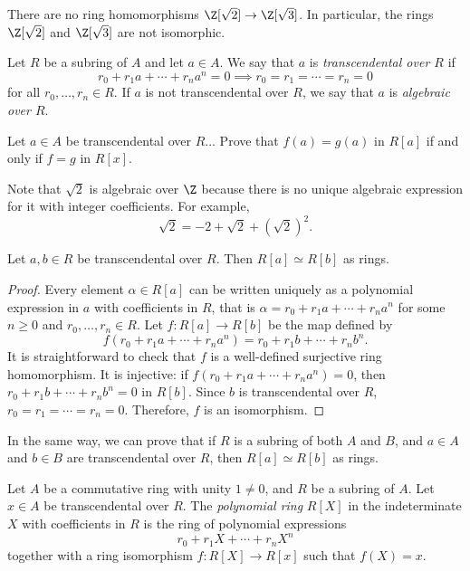 \documentclass[12pt]{amsproc}
\begin{document}
\begin{exercise}
    There are no ring homomorphisms $\Z[\sqrt{2}] \to \Z[\sqrt{3}]$. In particular, 
    the rings $\Z[\sqrt{2}]$ and $\Z[\sqrt{3}]$ are not isomorphic. 
\end{exercise}


\begin{definition}
    Let $R$ be a subring of $A$ and let $a\in A$. 
    We say that $a$ is \emph{transcendental over $R$} 
    if 
    \[
    r_0+r_1a+\cdots+r_na^n=0\implies r_0=r_1=\cdots=r_n=0
    \]
    for all $r_0,\dots,r_n\in R$. If $a$ is not transcendental over $R$, we say that $a$ is \emph{algebraic over $R$}.
\end{definition}

\begin{exercise}
    Let $a\in A$ be transcendental over $R$... Prove that 
    $f(a)=g(a)$ in $R[a]$ if and only if $f=g$ in $R[x]$. 
\end{exercise}

Note that $\sqrt{2}$ is algebraic over $\Z$ because
there is no unique algebraic expression for it with integer coefficients. For example,
\[
\sqrt{2}=-2+\sqrt{2}+(\sqrt{2})^2.
\]

\begin{theorem}
Let $a,b\in R$ be transcendental over $R$. Then $R[a]\simeq R[b]$ as rings.
\end{theorem}

\begin{proof}
    Every element $\alpha\in R[a]$ can be written uniquely as a polynomial expression in $a$ with coefficients in $R$, that
    is $\alpha = r_0 + r_1 a + \cdots + r_n a^n$ for some $n\ge 0$ and $r_0,\dots,r_n\in R$.   
    Let $f\colon R[a]\to R[b]$ be the map defined by
    \[
    f(r_0 + r_1 a + \cdots + r_n a^n) = r_0 + r_1 b + \cdots + r_n b^n.
    \]
    It is straightforward to check that $f$ is a well-defined surjective 
    ring homomorphism. It is injective: if $f(r_0 + r_1 a + \cdots + r_n a^n)=0$, then $r_0 + r_1 b + \cdots + r_n b^n=0$ in $R[b]$. 
    Since $b$ is transcendental over $R$, $r_0=r_1=\cdots=r_n=0$. Therefore, $f$ is an isomorphism.
    \end{proof}

In the same way, we can prove that if $R$ is a subring of both $A$ and $B$, 
and $a\in A$ and $b\in B$ are transcendental over $R$, then $R[a]\simeq R[b]$ as rings.

\begin{definition}
    Let $A$ be a commutative ring with unity $1\ne 0$, and $R$ be a subring of $A$. Let 
    $x\in A$ be transcendental over $R$. The \emph{polynomial ring} $R[X]$ 
    in the indeterminate $X$ 
    with coefficients in $R$ is the ring of polynomial expressions 
    \[
    r_0+r_1X+\cdots+r_nX^n
    \]
    together with a ring isomorphism $f\colon R[X]\to R[x]$ such that $f(X)=x$. 
\end{definition}
\end{document}
